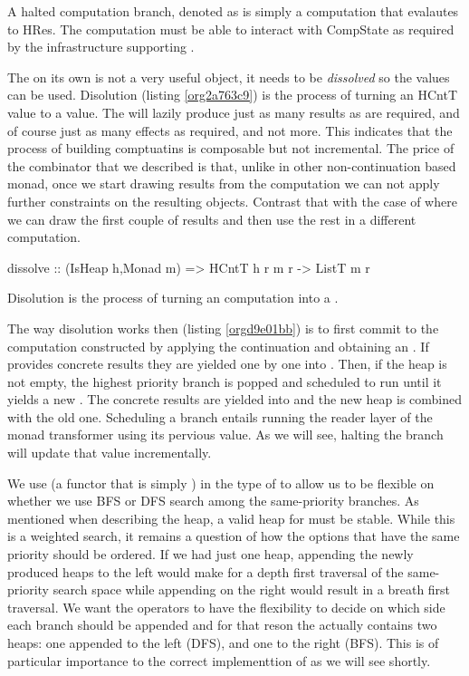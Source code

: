 A halted computation branch, denoted as  is simply a
computation that evalautes to HRes. The computation must be able to
interact with CompState as required by the infrastructure supporting
\hask{<//>}.

The  on its own is not a very useful object, it needs to be
\emph{dissolved} so the values can be used. Disolution (listing
\ref{org2a763c9}) is the process of turning an HCntT value to a 
value. The  will lazily produce just as many results as are
required, and of course just as many effects as required, and not
more. This indicates that the process of building comptuatins is
composable but not incremental. The price of the \hask{<//>} combinator
that we described is that, unlike in other non-continuation based
monad, once we start drawing results from the computation we can not
apply further constraints on the resulting objects. Contrast that with
the case of  where we can draw the first couple of results and
then use the rest in a different computation.

\begin{code}
\begin{haskellcode}
dissolve :: (IsHeap h,Monad m) => HCntT h r m r -> ListT m r
\end{haskellcode}
\caption{\label{org2a763c9}Disolution is the process of turning an  computation into a .}
\end{code}

The way disolution works then (listing \ref{orgd9e01bb}) is to first
commit to the computation constructed by applying the continuation and
obtaining an . If  provides concrete results they are
yielded one by one into . Then, if the heap is not empty, the
highest priority branch is popped and scheduled to run until it yields
a new . The concrete results are yielded into  and the
new heap is combined with the old one. Scheduling a branch entails
running the reader layer of the monad transformer using its pervious
value. As we will see, halting the branch will update that value
incrementally.

We use  (a functor that is simply ) in the
type of  to allow us to be flexible on whether we use BFS or DFS
search among the same-priority branches. As mentioned when describing
the heap, a valid heap for  must be stable. While this is a
weighted search, it remains a question of how the options that have
the same priority should be ordered. If we had just one heap,
appending the newly produced heaps to the left would make for a depth
first traversal of the same-priority search space while appending on
the right would result in a breath first traversal. We want the
operators to have the flexibility to decide on which side each branch
should be appended and for that reson the  actually contains two
heaps: one appended to the left (DFS), and one to the right
(BFS). This is of particular importance to the correct implementtion
of \hask{<//>} as we will see shortly.


